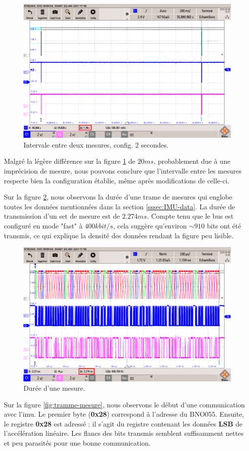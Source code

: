\begin{figure}[H]
	\centering
	\includegraphics[width=.7\linewidth]{../figures/mesures/I2C/Intervale-2s}
	\caption{Intervale entre deux mesures, config. 2 secondes.}
	\label{fig:intervale-2s}
\end{figure}

Malgré la légère différence sur la figure \ref{fig:intervale-2s} de $20ms$, probablement due à une imprécision de mesure, nous pouvons conclure que l'intervalle entre les mesures respecte bien la configuration établie, même après modifications de celle-ci.

Sur la figure \ref{fig:duree-comm}, nous observons la durée d'une trame de mesures qui englobe toutes les données mentionnées dans la section \ref{sssec:IMU-data}. La durée de transmission d'un set de mesure est de $2.274ms$. Compte tenu que le bus est configuré en mode "fast" à $400 kbit/s$, cela suggère qu'environ $\sim910$ bits ont été transmis, ce qui explique la densité des données rendant la figure peu lisible.

\begin{figure}[H]
	\centering
	\includegraphics[width=.7\linewidth]{../figures/mesures/I2C/duree-comm}
	\caption{Durée d'une mesure.}
	\label{fig:duree-comm}
\end{figure}

Sur la figure \ref{fig:tramme-mesure}, nous observons le début d'une communication avec l'\gls{imu}. Le premier byte (\textbf{0x28}) correspond à l'adresse du BNO055. Ensuite, le registre \textbf{0x28} est adressé : il s'agit du registre contenant les données \textbf{LSB} de l'accélération linéaire. Les flancs des bits transmis semblent suffisamment nettes et peu parasités pour une bonne communication.

